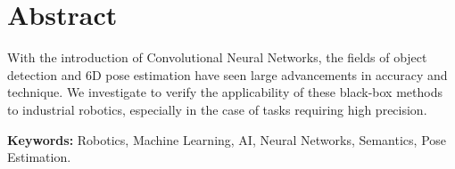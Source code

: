 \chapter*{Abstract} 
With the introduction of Convolutional Neural Networks, the fields of object detection and 6D pose estimation have seen large advancements in accuracy and technique. We investigate to verify the applicability of these black-box methods to industrial robotics, especially in the case of tasks requiring high precision.

\textbf{Keywords:} Robotics, Machine Learning, AI, Neural Networks, Semantics, Pose Estimation.